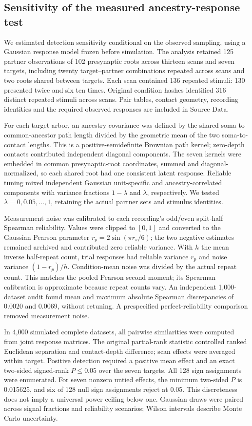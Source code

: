 \subsection{Sensitivity of the measured ancestry-response test}
\label{note:measured_alignment_power}
We estimated detection sensitivity conditional on the observed sampling, using a Gaussian response model frozen before simulation. The analysis retained 125 partner observations of 102 presynaptic roots across thirteen scans and seven targets, including twenty target--partner combinations repeated across scans and two roots shared between targets. Each scan contained 136 repeated stimuli: 130 presented twice and six ten times. Original condition hashes identified 316 distinct repeated stimuli across scans. Pair tables, contact geometry, recording identities and the required observed responses are included in Source Data.

For each target arbor, an ancestry covariance was defined by the shared soma-to-common-ancestor path length divided by the geometric mean of the two soma-to-contact lengths. This is a positive-semidefinite Brownian path kernel; zero-depth contacts contributed independent diagonal components. The seven kernels were embedded in common presynaptic-root coordinates, summed and diagonal-normalized, so each shared root had one consistent latent response. Reliable tuning mixed independent Gaussian unit-specific and ancestry-correlated components with variance fractions $1-\lambda$ and $\lambda$, respectively. We tested $\lambda=0,0.05,\ldots,1$, retaining the actual partner sets and stimulus identities.

Measurement noise was calibrated to each recording's odd/even split-half Spearman reliability. Values were clipped to $[0,1]$ and converted to the Gaussian Pearson parameter $r_p=2\sin(\pi r_s/6)$; the two negative estimates remained archived and contributed zero reliable variance. With $h$ the mean inverse half-repeat count, trial responses had reliable variance $r_p$ and noise variance $(1-r_p)/h$. Condition-mean noise was divided by the actual repeat count. This matches the pooled Pearson second moment; its Spearman calibration is approximate because repeat counts vary. An independent 1,000-dataset audit found mean and maximum absolute Spearman discrepancies of 0.0020 and 0.0069, without retuning. A prespecified perfect-reliability comparison removed measurement noise.

In 4,000 simulated complete datasets, all pairwise similarities were computed from joint response matrices. The original partial-rank statistic controlled ranked Euclidean separation and contact-depth difference; scan effects were averaged within target. Positive detection required a positive mean effect and an exact two-sided signed-rank $P\leq0.05$ over the seven targets. All 128 sign assignments were enumerated. For seven nonzero untied effects, the minimum two-sided $P$ is 0.015625, and six of 128 null sign assignments reject at 0.05. This discreteness does not imply a universal power ceiling below one. Gaussian draws were paired across signal fractions and reliability scenarios; Wilson intervals describe Monte Carlo uncertainty.

